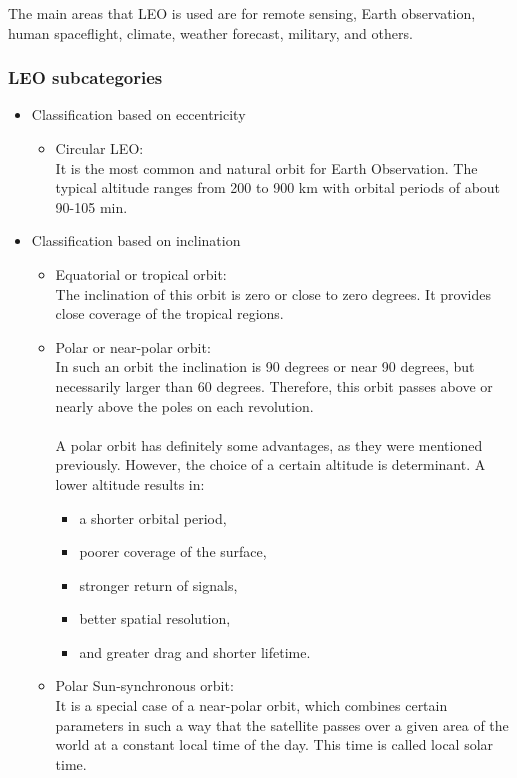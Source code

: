 The main areas that LEO is used are for remote sensing, Earth observation, human spaceflight, climate, weather forecast, military, and others. 

\pagebreak
\subsubsection{LEO subcategories}
\bigskip

\begin{itemize}
\item Classification based on eccentricity
	\begin{itemize}
	\item Circular LEO: \\
	It is the most common and natural orbit for Earth Observation. The typical altitude ranges from 200 to 900 km with orbital periods of about 90-105 min.
	\end{itemize}
\item Classification based on inclination
	\begin{itemize}
	\item Equatorial or tropical orbit: \\
	The inclination of this orbit is zero or close to zero degrees. It provides close coverage of the tropical regions.
	\item Polar or near-polar orbit: \\
	In such an orbit the inclination is 90 degrees or near 90 degrees, but necessarily larger than 60 degrees. Therefore, this orbit passes above or nearly above the poles on each revolution. \\ %
	\\
	A polar orbit has definitely some advantages, as they were mentioned previously. However, the choice of a certain altitude is determinant. A lower altitude results in:
		\begin{itemize}
		\item a shorter orbital period,
		\item poorer coverage of the surface,
		\item stronger return of signals,
		\item better spatial resolution,
		\item and greater drag and shorter lifetime.
		\end{itemize}
	\item Polar Sun-synchronous orbit: \\
	It is a special case of a near-polar orbit, which combines certain parameters in such a way that the satellite passes over a given area of the world at a constant local time of the day. This time is called local solar time.
	

\end{itemize}
\end{itemize}
